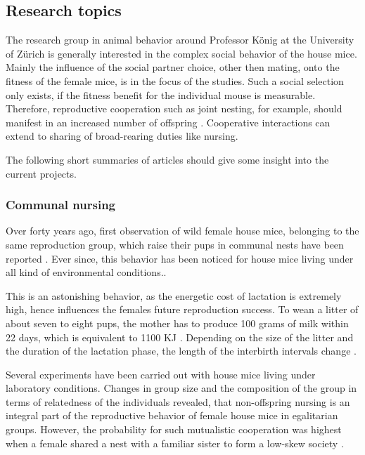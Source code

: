 \subsection{Research topics}
\label{subsec:researchtopics}

The research group in animal behavior around Professor K\"onig at the University of Z\"urich is generally interested in the complex social behavior of the house mice. Mainly the influence of the social partner choice, other then mating, onto the fitness of the female mice, is in the focus of the studies. Such a social selection only exists, if the fitness benefit for the individual mouse is measurable. Therefore, reproductive cooperation such as joint nesting, for example, should manifest in an increased number of offspring \cite{weidt:07}. Cooperative interactions can extend to sharing of broad-rearing duties like nursing.

The following short summaries of articles should give some insight into the current projects.

\subsubsection{Communal nursing}
\label{subsubsec:comnurs}

Over forty years ago, first observation of wild female house mice, belonging to the same reproduction group, which raise their pups in communal nests have been reported \cite{southwick:55}. Ever since, this behavior has been noticed for house mice living under all kind of environmental conditions.\cite{crowcroft:63, sayler:69, gandelman:70, werboff:70, baker:81}.

This is an astonishing behavior, as the energetic cost of lactation is extremely high, hence influences the females future reproduction success. To wean a litter of about seven to eight pups, the mother has to produce 100 grams of milk within 22 days, which is equivalent to 1100 \acf{KJ} \cite{koenig:88}. Depending on the size of the litter and the duration of the lactation phase, the length of the interbirth intervals change \cite{fuchs:81, fuchs:82, koenig:87a, koenig:87b}.

Several experiments have been carried out with house mice living under laboratory conditions. Changes in group size and the composition of the group in terms of relatedness of the individuals revealed, that non-offspring nursing is an integral part of the reproductive behavior of female house mice in egalitarian groups. However, the probability for such mutualistic cooperation was highest when a female shared a nest with a familiar sister to form a low-skew society \cite{koenig:06}.

